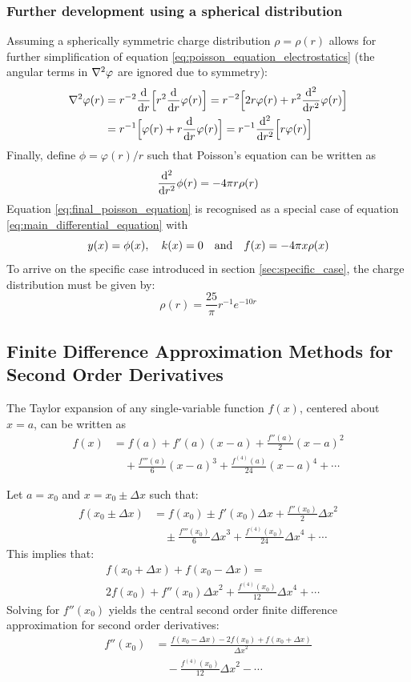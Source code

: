 \documentclass[reprint,english]{revtex4-1}
\begin{document}
\subsubsection{Further development using a spherical distribution}
Assuming a spherically symmetric charge distribution \(\rho=\rho(r)\) allows for further simplification of equation \eqref{eq:poisson_equation_electrostatics} (the angular terms in \(\laplacian\varphi\) are ignored due to symmetry):
\begin{align*}
\laplacian\varphi(r)&=r^{-2}\dv{r}\Big[r^2\dv{r}\varphi(r)\Big]=r^{-2}\Big[2r\varphi(r)+r^2\dv[2]{r}\varphi(r)\Big]\\
&=r^{-1}\Big[\varphi(r)+r\dv{r}\varphi(r)\Big]=r^{-1}\dv[2]{r}\Big[r\varphi(r)\Big]
\end{align*}
Finally, define \(\phi=\varphi(r)/r\) such that Poisson's equation can be written as
\begin{equation}\label{eq:final_poisson_equation}
\dv[2]{r}\phi(r)=-4\pi r\rho(r)
\end{equation}
Equation \eqref{eq:final_poisson_equation} is recognised as a special case of equation \eqref{eq:main_differential_equation} with
\[y(x)=\phi(x)\qcomma k(x)=0\qand f(x)=-4\pi x\rho(x)\]
To arrive on the specific case introduced in section \ref{sec:specific_case}, the charge distribution must be given by:
\[\rho(r)=\frac{25}{\pi}r^{-1}e^{-10r}\]
\subsection{Finite Difference Approximation Methods for Second Order Derivatives}\label{sec:finite_difference_methods}
The Taylor expansion of any single-variable function \(f(x)\), centered about \(x=a\), can be written as
\begin{align}
f(x)&= f(a)+f'(a)(x-a)+\frac{f''(a)}{2}(x-a)^2\nonumber\\
&\quad +\frac{f'''(a)}{6}(x-a)^3+\frac{f^{(4)}(a)}{24}(x-a)^4+\cdots\label{eq:second_order_taylor_expansion}
\end{align}

Let \(a=x_0\) and \(x=x_0\pm\Delta x\) such that:
\begin{align}
f(x_0\pm\Delta x)&=f(x_0)\pm f'(x_0)\Delta x+\frac{f''(x_0)}{2}{\Delta x}^2\nonumber\\
&\quad \pm\frac{f'''(x_0)}{6}{\Delta x}^3+\frac{f^{(4)}(x_0)}{24}{\Delta x}^4+\cdots
\end{align}
This implies that:
\begin{align*}
&f(x_0+\Delta x)+f(x_0-\Delta x)=\\
&2f(x_0)+f''(x_0){\Delta x}^2+\frac{f^{(4)}(x_0)}{12}{\Delta x}^4+\cdots
\end{align*}
Solving for \(f''(x_0)\) yields the central second order finite difference approximation for second order derivatives:
\begin{align}
f''(x_0)&=\frac{f(x_0-\Delta x)-2f(x_0)+f(x_0+\Delta x)}{{\Delta x}^2}\nonumber\\
&\quad -\frac{f^{(4)}(x_0)}{12}{\Delta x}^2-\cdots\label{eq:second_order_finite_difference_approximation}
\end{align}
\end{document}
